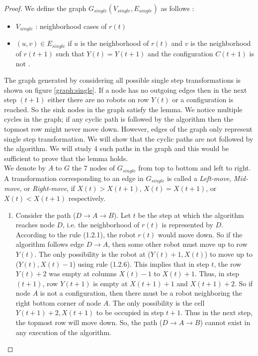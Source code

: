 \begin{proof}

We define the graph $G_{single}(V_{single}, E_{single})$ as follows :
\begin{itemize}
  \item $V_{single}$ : neighborhood cases of $r(t)$
  \item $(u,v) \in E_{single}$ if $u$ is the neighborhood of $r(t)$ and $v$ is the neighborhood of $r(t+1)$ such that $Y(t)=Y(t+1)$ and the configuration $C(t+1)$ is not \Gathered.
\end{itemize}
The graph generated by considering all possible single step transformations is shown on figure \ref{graph:single}. If a node has no outgoing edges then in the next step $(t+1)$ either there are no robots on row $Y(t)$ or a \Gathered configuration is reached. So the sink nodes in the graph satisfy the lemma. 
We notice multiple cycles in the graph; if any cyclic path is followed by the algorithm then the topmost row might never move down. However, edges of the graph only represent single step transformation. We will show that the cyclic paths are not followed by the algorithm. We will study 4 such paths in the graph and this would be sufficient to prove that the lemma holds. \\

\noindent
We denote by $A$ to $G$ the 7 nodes of $G_{single}$ from top to bottom and left to right. \\
A transformation corresponding to an edge in $G_{single}$ is called a \emph{Left-move}, \emph{Mid-move}, or \emph{Right-move}, if  $X(t) > X(t+1)$, $X(t) = X(t+1)$, or $X(t) < X(t+1)$ respectively.\\

\begin{enumerate}
\item
Consider the path ($D \rightarrow A \rightarrow B$). 
Let $t$ be the step at which the algorithm reaches node $D$, i.e. the neighborhood of $r(t)$ is represented by $D$. According to the rule (1.2.1), the robot $r(t)$ would move down. So if the algorithm follows edge $D \rightarrow A$, then some other robot must move up to row $Y(t)$. The only possibility is the robot at ($Y(t)+1,X(t)$) to move up to ($Y(t),X(t)-1$) using rule (1.2.6). This implies that in step $t$, the row $Y(t)+2$ was empty at columns $X(t)-1$ to $X(t)+1$. Thus, in step $(t+1)$, row $Y(t+1)$ is empty at $X(t+1)+1$ and $X(t+1)+2$. So if node $A$ is not a \Gathered configuration, then there must be a robot neighboring the right bottom corner of node $A$. The only possibility is the cell $Y(t+1)+2, X(t+1)$ to be occupied in step $t+1$. Thus in the next step, the topmost row will move down. So, the path ($D \rightarrow A \rightarrow B$) cannot exist in any execution of the algorithm.


\end{enumerate}
\end{proof}

